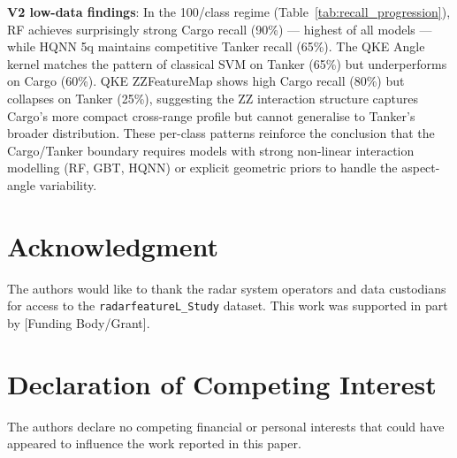 \documentclass[journal]{IEEEtran}
\begin{document}
\noindent\textbf{V2 low-data findings}: In the 100/class regime (Table~\ref{tab:recall_progression}),
RF achieves surprisingly strong Cargo recall (90\%) — highest of all models
— while HQNN 5q maintains competitive Tanker recall (65\%). The QKE Angle
kernel matches the pattern of classical SVM on Tanker (65\%) but underperforms
on Cargo (60\%). QKE ZZFeatureMap shows high Cargo recall (80\%) but collapses
on Tanker (25\%), suggesting the ZZ interaction structure captures Cargo's more
compact cross-range profile but cannot generalise to Tanker's broader distribution.
These per-class patterns reinforce the conclusion that the Cargo/Tanker boundary
requires models with strong non-linear interaction modelling (RF, GBT, HQNN)
or explicit geometric priors to handle the aspect-angle variability.

\section*{Acknowledgment}
The authors would like to thank the radar system operators and data custodians for access to the \texttt{radarfeatureL\_Study} dataset. This work was supported in part by [Funding Body/Grant].

\section*{Declaration of Competing Interest}
The authors declare no competing financial or personal interests that could have appeared to influence the work reported in this paper.
\end{document}
